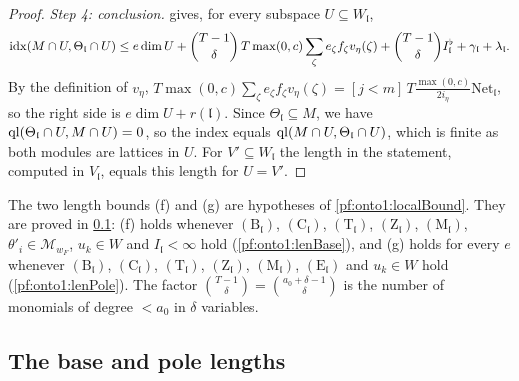 \begin{proof}
\emph{Step 4: conclusion.}  gives, for every subspace $U\subseteq W_{\mathfrak l}$,
\[
\operatorname{idx}(M\cap U,\Theta_{\mathfrak l}\cap U)\le e\dim U+\binom{T-1}{\delta}\,T\max(0,c)\sum_\zeta e_\zeta f_\zeta
v_\eta(\zeta)+\binom{T-1}{\delta} I_{\mathfrak l}^\flat+\gamma_{\mathfrak l}+\lambda_{\mathfrak l}.
\]
By the definition of $v_\eta$, $T\max(0,c)\sum_\zeta e_\zeta f_\zeta v_\eta(\zeta)=[j<m]\,T\frac{\max(0,c)}{2i_\eta}
\mathrm{Net}_{\mathfrak l}$, so the right side is $e\dim U+r(\mathfrak l)$. Since $\Theta_{\mathfrak l}\subseteq M$, we have
$\operatorname{ql}(\Theta_{\mathfrak l}\cap U,M\cap U)=0$, so the index equals $\operatorname{ql}(M\cap U,\Theta_{\mathfrak l}\cap U)$,
which is finite as both modules are lattices in $U$. For $V'\subseteq W_{\mathfrak l}$ the length in the statement,
computed in $V_{\mathfrak l}$, equals this length for $U=V'$.
\end{proof}

\begin{remark}\label{pf:onto1:rem-local}
The two length bounds (f) and (g) are hypotheses of \cref{pf:onto1:localBound}. They are proved in
\cref{sec:pf:onto1:lengths}: (f) holds whenever $(\mathrm B_{\mathfrak l})$, $(\mathrm C_{\mathfrak l})$, $(\mathrm T_{\mathfrak l})$,
$(\mathrm Z_{\mathfrak l})$, $(\mathrm M_{\mathfrak l})$, $\theta'_i\in\mathcal M_{w_F}$, $u_k\in W$ and $I_{\mathfrak l}<\infty$ hold
(\cref{pf:onto1:lenBase}), and (g) holds for every $e$ whenever $(\mathrm B_{\mathfrak l})$, $(\mathrm C_{\mathfrak l})$, $(\mathrm
T_{\mathfrak l})$, $(\mathrm Z_{\mathfrak l})$, $(\mathrm M_{\mathfrak l})$, $(\mathrm E_{\mathfrak l})$ and $u_k\in W$ hold
(\cref{pf:onto1:lenPole}). The factor $\binom{T-1}{\delta}=\binom{a_0+\delta-1}{\delta}$ is the number of monomials of degree
$<a_0$ in $\delta$ variables.
\end{remark}

\subsection{The base and pole lengths}\label{sec:pf:onto1:lengths}

